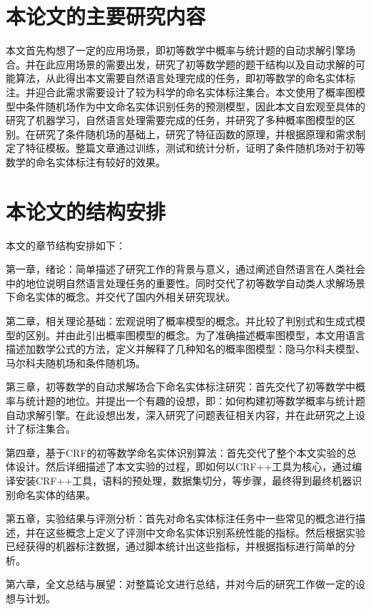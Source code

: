 \section{本论文的主要研究内容}
本文首先构想了一定的应用场景，即初等数学中概率与统计题的自动求解引擎场合。并在此应用场景的需要出发，研究了初等数学题的题干结构以及自动求解的可能算法，从此得出本文需要自然语言处理完成的任务，即初等数学的命名实体标注。并迎合此需求需要设计了较为科学的命名实体标注集合。本文使用了概率图模型中条件随机场作为中文命名实体识别任务的预测模型，因此本文自宏观至具体的研究了机器学习，自然语言处理需要完成的任务，并研究了多种概率图模型的区别。在研究了条件随机场的基础上，研究了特征函数的原理，并根据原理和需求制定了特征模板。整篇文章通过训练，测试和统计分析，证明了条件随机场对于初等数学的命名实体标注有较好的效果。


\section{本论文的结构安排}
本文的章节结构安排如下：

第一章，绪论：简单描述了研究工作的背景与意义，通过阐述自然语言在人类社会中的地位说明自然语言处理任务的重要性。同时交代了初等数学自动类人求解场景下命名实体的概念。并交代了国内外相关研究现状。

第二章，相关理论基础：宏观说明了概率模型的概念。并比较了判别式和生成式模型的区别。并由此引出概率图模型的概念。为了准确描述概率图模型，本文用语言描述加数学公式的方法，定义并解释了几种知名的概率图模型：隐马尔科夫模型、马尔科夫随机场和条件随机场。

第三章，初等数学的自动求解场合下命名实体标注研究：首先交代了初等数学中概率与统计题的地位。并提出一个有趣的设想，即：如何构建初等数学概率与统计题自动求解引擎。在此设想出发，深入研究了问题表征相关内容，并在此研究之上设计了标注集合。

第四章，基于CRF的初等数学命名实体识别算法：首先交代了整个本文实验的总体设计。然后详细描述了本文实验的过程，即如何以CRF++工具为核心，通过编译安装CRF++工具，语料的预处理，数据集切分，等步骤，最终得到最终机器识别命名实体的结果。

第五章，实验结果与评测分析：首先对命名实体标注任务中一些常见的概念进行描述，并在这些概念上定义了评测中文命名实体识别系统性能的指标。然后根据实验已经获得的机器标注数据，通过脚本统计出这些指标，并根据指标进行简单的分析。

第六章，全文总结与展望：对整篇论文进行总结，并对今后的研究工作做一定的设想与计划。
